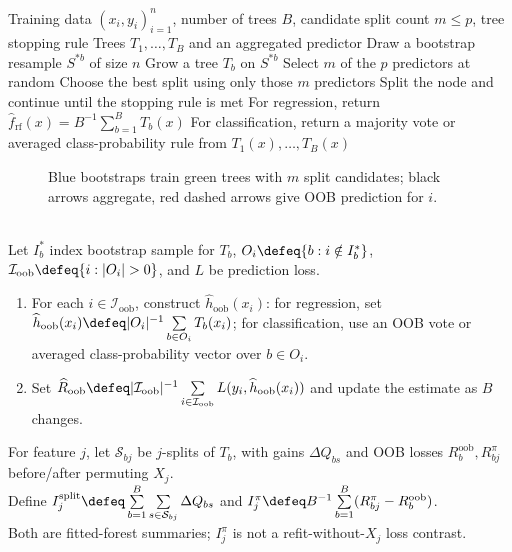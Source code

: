\begin{breakablealgorithm}
\caption{Random Forest}
\label{alg:sl-random-forest}
\begin{algorithmic}
\Require Training data $(x_i,y_i)_{i=1}^n$, number of trees $B$, candidate split count $m\leq p$, tree stopping rule
\Ensure Trees $T_1,\ldots,T_B$ and an aggregated predictor
\State Draw a bootstrap resample $S^{\ast b}$ of size $n$
\State Grow a tree $T_b$ on $S^{\ast b}$
\State Select $m$ of the $p$ predictors at random
\State Choose the best split using only those $m$ predictors
\State Split the node and continue until the stopping rule is met
\EndFor
\EndFor
\State For regression, return $\widehat{f}_{\mathrm{rf}}(x)=B^{-1}\sum_{b=1}^B T_b(x)$
\State For classification, return a majority vote or averaged class-probability rule from $T_1(x),\ldots,T_B(x)$
\end{algorithmic}
\end{breakablealgorithm}

\begin{figure}[H]
\centering

\caption{\textcolor{cyan!65!black}{Blue} bootstraps train \textcolor{green!45!black}{green} trees with $m$ split candidates; black arrows aggregate, \textcolor{red!70!black}{red dashed} arrows give OOB prediction for $i$.}
\label{fig:sl-random-forest-oob-decorrelation}
\end{figure}

\begin{method} \label{meth:sl-random-forest-oob-and-importance} \\
Let $I_b^*$ index bootstrap sample for $T_b$, $O_i\defeq\{b:i\notin I_b^*\}$, $\mathcal{I}_{\mathrm{oob}}\defeq\{i:|O_i|>0\}$, and $L$ be prediction loss.
\begin{enumerate}[label=(\roman*)]
\setlength{\itemsep}{0pt}
\item For each $i\in\mathcal{I}_{\mathrm{oob}}$, construct $\widehat{h}_{\mathrm{oob}}(x_i)$: for regression, set $\widehat{h}_{\mathrm{oob}}(x_i)\defeq |O_i|^{-1}\sum\limits_{b\in O_i}T_b(x_i)$; for classification, use an OOB vote or averaged class-probability vector over $b\in O_i$.
\item Set $\widehat{R}_{\mathrm{oob}}\defeq |\mathcal{I}_{\mathrm{oob}}|^{-1}\sum\limits_{i\in\mathcal{I}_{\mathrm{oob}}}L(y_i,\widehat{h}_{\mathrm{oob}}(x_i))$ and update the estimate as $B$ changes.
\end{enumerate}
For feature $j$, let $\mathcal{S}_{bj}$ be $j$-splits of $T_b$, with gains $\Delta Q_{bs}$ and OOB losses $R_b^{\mathrm{oob}},R_{bj}^{\pi}$ before/after permuting $X_j$.\\
Define $I_j^{\mathrm{split}}\defeq\sum\limits_{b=1}^B\sum\limits_{s\in\mathcal{S}_{bj}}\Delta Q_{bs}$ and $I_j^{\pi}\defeq B^{-1}\sum\limits_{b=1}^B(R_{bj}^{\pi}-R_b^{\mathrm{oob}})$.\\
Both are fitted-forest summaries; $I_j^{\pi}$ is not a refit-without-$X_j$ loss contrast.
\end{method}

